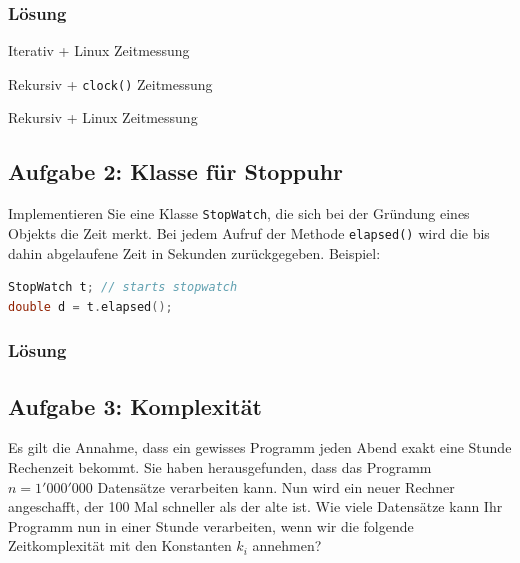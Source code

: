 \subsubsection{Lösung}

\large{Iterativ + Linux Zeitmessung}


\large{Rekursiv + \texttt{clock()} Zeitmessung}


\large{Rekursiv + Linux Zeitmessung}


\subsection{Aufgabe 2: Klasse für Stoppuhr}
Implementieren Sie eine Klasse \texttt{StopWatch}, die sich bei der Gründung eines Objekts die Zeit merkt. Bei
jedem Aufruf der Methode \texttt{elapsed()} wird die bis dahin abgelaufene Zeit in Sekunden zurückgegeben.
Beispiel:

\begin{lstlisting}[language=C++, style=C++]
StopWatch t; // starts stopwatch
double d = t.elapsed();
\end{lstlisting}

\subsubsection{Lösung}


\noindent\makebox[\linewidth]{\rule{\paperwidth}{0.4pt}}

\noindent\makebox[\linewidth]{\rule{\paperwidth}{0.4pt}}

\twocolumn

\subsection{Aufgabe 3: Komplexität}


Es gilt die Annahme, dass ein gewisses Programm jeden Abend exakt eine Stunde Rechenzeit bekommt.
Sie haben herausgefunden, dass das Programm $n=1'000'000$ Datensätze verarbeiten kann. Nun wird ein
neuer Rechner angeschafft, der 100 Mal schneller als der alte ist.
Wie viele Datensätze kann Ihr Programm nun in einer Stunde verarbeiten, wenn wir die folgende Zeitkomplexität
mit den Konstanten $k_i$ annehmen?

